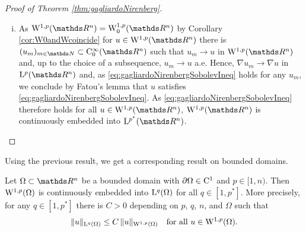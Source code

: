 \begin{proof}[Proof of Theorem \ref{thm:gagliardoNirenberg}]
\begin{enumerate}[i)]
    \item As $\WW^{1,p}(\R^n) = \WW_0^{1,p}(\R^n)$ by Corollary \ref{cor:W0andWcoincide} for $u \in \WW^{1,p}(\R^n)$ there is $(u_m)_{m \in \N} \subset \CC_0^\infty(\R^n)$ such that $u_m \to u$ in $\WW^{1,p}(\R^n)$ and, up to the choice of a subsequence, $u_m \to u$ a.e.
      Hence, $\nabla u_m \to \nabla u$ in $\Ell^p(\R^n)$ and, as \eqref{eq:gagliardoNirenbergSobolevIneq} holds for any $u_m$, we conclude by Fatou's lemma that $u$ satisfies \eqref{eq:gagliardoNirenbergSobolevIneq}.
      As \eqref{eq:gagliardoNirenbergSobolevIneq} therefore holds for all $u \in \WW^{1,p}(\R^n)$, $\WW^{1,p}(\R^n)$ is continuously embedded into $\Ell^{p^*}(\R^n)$. \qedhere
  \end{enumerate}
\end{proof}

Using the previous result, we get a corresponding result on bounded domains.

\begin{thm}
  \label{thm:embeddingpltn}
  Let $\Omega \subset \R^n$ be a bounded domain with $\partial\Omega \in \mathrm{C}^1$ and $p \in [1,n)$.
    Then $\mathrm{W}^{1,p}(\Omega)$ is continuously embedded into $\mathrm{L}^q(\Omega)$ for all $q \in [1,p^*]$.
    More precisely, for any $q \in [1,p^*]$ there is $C > 0$ depending on $p$, $q$, $n$, and $\Omega$ such that
    \begin{equation}
      \label{eq:embeddingForpltn}
      \|u\|_{\mathrm{L}^q(\Omega)} \leq C \, \| u\|_{\mathrm{W}^{1,p}(\Omega)} \quad\text{for all } u \in \mathrm{W}^{1,p}(\Omega).
    \end{equation}
\end{thm}

